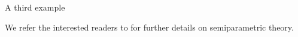 \documentclass[11pt]{article}
\def\sigmoid{\mathsf{sigmoid}}
\begin{document}
\begin{example}


\end{example}

\begin{example}
\label{eg:nde}
A third example 
\end{example}

We refer the interested readers to \citet{bickel1998efficient, tsiatis2007semiparametric, van2002part} for further details on semiparametric theory.
\end{document}
